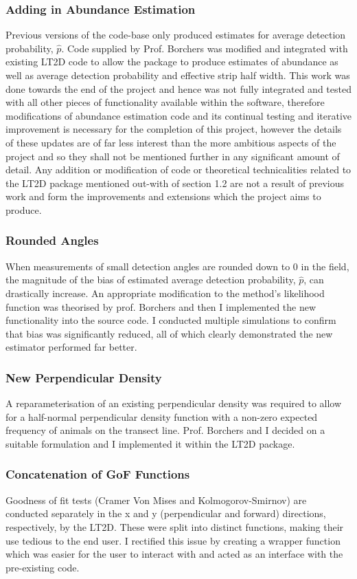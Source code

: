 \documentclass[11pt]{article}
\begin{document}
\begin{multicols}{2}
\subsubsection{Adding in Abundance Estimation}
Previous versions of the code-base only produced estimates for average detection probability, $\hat{p}$. Code supplied by Prof. Borchers was modified and integrated with existing LT2D code to allow the package to produce estimates of abundance as well as average detection probability and effective strip half width. This work was done towards the end of the project and hence was not fully integrated and tested with all other pieces of functionality available within the software, therefore modifications of abundance estimation code and its continual testing and iterative improvement is necessary for the completion of this project, however the details of these updates are of far less interest than the more ambitious aspects of the project and so they shall not be mentioned further in any significant amount of detail. Any addition or modification of code or theoretical technicalities related to the LT2D package mentioned out-with of section 1.2 are not a result of previous work and form the improvements and extensions which the project aims to produce.

\subsubsection{Rounded Angles}
When measurements of small detection angles are rounded down to $0$ in the field, the magnitude of the bias of estimated average detection probability, $\hat{p}$, can drastically increase. An appropriate modification to the method's likelihood function was theorised by prof. Borchers and then I implemented the new functionality into the source code. I conducted multiple simulations to confirm that bias was significantly reduced, all of which clearly demonstrated the new estimator performed far better.

\subsubsection{New Perpendicular Density}
A reparameterisation of an existing perpendicular density was required to allow for a  half-normal perpendicular density function with a non-zero expected frequency of animals on the transect line. Prof. Borchers and I decided on a suitable formulation and I implemented it within the LT2D package. 

\subsubsection{Concatenation of GoF Functions}
Goodness of fit tests (Cramer Von Mises and Kolmogorov-Smirnov) are conducted separately in the x and y (perpendicular and forward) directions, respectively, by the LT2D. These were split into distinct functions, making their use tedious to the end user. I rectified this issue by creating a wrapper function which was easier for the user to interact with and acted as an interface with the pre-existing code.


\end{multicols}
\end{document}
